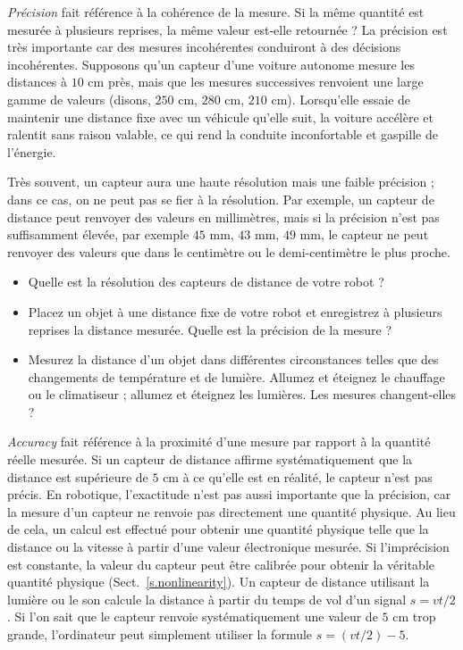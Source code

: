 \emph{Précision} fait référence à la cohérence de la mesure. Si la même quantité est mesurée à plusieurs reprises, la même valeur est-elle retournée ? La précision est très importante car des mesures incohérentes conduiront à des décisions incohérentes. Supposons qu'un capteur d'une voiture autonome mesure les distances à $10$ cm près, mais que les mesures successives renvoient une large gamme de valeurs (disons, $250$ cm, $280$ cm, $210$ cm). Lorsqu'elle essaie de maintenir une distance fixe avec un véhicule qu'elle suit, la voiture accélère et ralentit sans raison valable, ce qui rend la conduite inconfortable et gaspille de l'énergie.

Très souvent, un capteur aura une haute résolution mais une faible précision ; dans ce cas, on ne peut pas se fier à la résolution. Par exemple, un capteur de distance peut renvoyer des valeurs en millimètres, mais si la précision n'est pas suffisamment élevée, par exemple $45$ mm, $43$ mm, $49$ mm, le capteur ne peut renvoyer des valeurs que dans le centimètre ou le demi-centimètre le plus proche.

\begin{framed}
\begin{itemize}
\item Quelle est la résolution des capteurs de distance de votre robot ?
\item Placez un objet à une distance fixe de votre robot et enregistrez à plusieurs reprises la distance mesurée. Quelle est la précision de la mesure ?
\item Mesurez la distance d'un objet dans différentes circonstances telles que des changements de température et de lumière. Allumez et éteignez le chauffage ou le climatiseur ; allumez et éteignez les lumières. Les mesures changent-elles ?
\end{itemize}
\end{framed}

\emph{Accuracy} fait référence à la proximité d'une mesure par rapport à la quantité réelle mesurée. Si un capteur de distance affirme systématiquement que la distance est supérieure de $5$ cm à ce qu'elle est en réalité, le capteur n'est pas précis. En robotique, l'exactitude n'est pas aussi importante que la précision, car la mesure d'un capteur ne renvoie pas directement une quantité physique. Au lieu de cela, un calcul est effectué pour obtenir une quantité physique telle que la distance ou la vitesse à partir d'une valeur électronique mesurée. Si l'imprécision est constante, la valeur du capteur peut être calibrée pour obtenir la véritable quantité physique (Sect.~\ref{s.nonlinearity}). Un capteur de distance utilisant la lumière ou le son calcule la distance à partir du temps de vol d'un signal $s=vt/2$. Si l'on sait que le capteur renvoie systématiquement une valeur de $5$ cm trop grande, l'ordinateur peut simplement utiliser la formule $s=(vt/2) - 5$.

